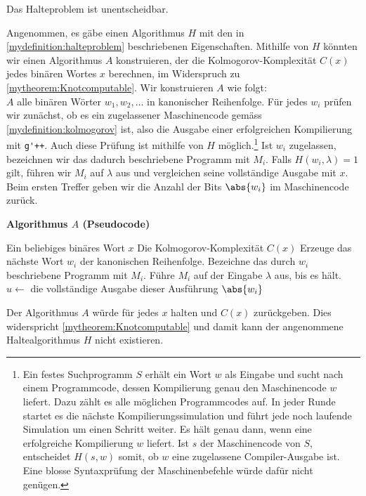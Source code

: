 \clearpage
\begin{mytheorem}[Halteproblem]\label{mytheorem:halteproblem}
	Das Halteproblem ist unentscheidbar.
	\begin{myproof}
		Angenommen, es gäbe einen Algorithmus $H$ mit den in \cref{mydefinition:halteproblem} beschriebenen Eigenschaften. Mithilfe von $H$ könnten wir einen Algorithmus $A$ konstruieren, der die Kolmogorov-Komplexität $C(x)$ jedes binären Wortes $x$ berechnen, im Widerspruch zu \cref{mytheorem:Knotcomputable}. Wir konstruieren $A$ wie folgt:\\

		$A$ alle binären Wörter $w_1,w_2,\ldots$ in kanonischer Reihenfolge.
		Für jedes $w_i$ prüfen wir zunächst, ob es ein zugelassener Maschinencode gemäss \cref{mydefinition:kolmogorov} ist, also die Ausgabe einer erfolgreichen Kompilierung mit \lstinline{g'++}. Auch diese Prüfung ist mithilfe von $H$ möglich.\footnote{Ein festes Suchprogramm $S$ erhält ein Wort $w$ als Eingabe und sucht nach einem Programmcode, dessen Kompilierung genau den Maschinencode $w$ liefert. Dazu zählt es alle möglichen Programmcodes auf. In jeder Runde startet es die nächste Kompilierungssimulation und führt jede noch laufende Simulation um einen Schritt weiter. Es hält genau dann, wenn eine erfolgreiche Kompilierung $w$ liefert. Ist $s$ der Maschinencode von $S$, entscheidet $H(s,w)$ somit, ob $w$ eine zugelassene Compiler-Ausgabe ist. Eine blosse Syntaxprüfung der Maschinenbefehle würde dafür nicht genügen.}
		Ist $w_i$ zugelassen, bezeichnen wir das dadurch beschriebene Programm mit $M_i$. Falls $H(w_i,\lambda)=1$ gilt, führen wir $M_i$ auf $\lambda$ aus und vergleichen seine vollständige Ausgabe mit $x$. Beim ersten Treffer geben wir die Anzahl der Bits $\abs{w_i}$ im Maschinencode zurück.

		\textbf{Algorithmus $A$ (Pseudocode)}
		\begin{algorithmic}[1]
			\Require Ein beliebiges binäres Wort $x$
			\Ensure Die Kolmogorov-Komplexität $C(x)$
				\State Erzeuge das nächste Wort $w_i$ der kanonischen Reihenfolge.
					\State Bezeichne das durch $w_i$ beschriebene Programm mit $M_i$.
						\State Führe $M_i$ auf der Eingabe $\lambda$ aus, bis es hält.
						\State $u \gets$ die vollständige Ausgabe dieser Ausführung
							\State \Return $\abs{w_i}$
						\EndIf
					\EndIf
				\EndIf
			\EndFor
		\end{algorithmic}

		Der Algorithmus $A$ würde für jedes $x$ halten und $C(x)$ zurückgeben. Dies widerspricht \cref{mytheorem:Knotcomputable} und damit kann der angenommene Haltealgorithmus $H$ nicht existieren.
	\end{myproof}
\end{mytheorem}

